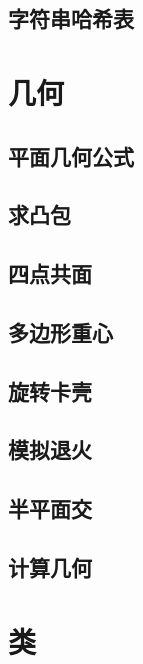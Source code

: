 \section{字符串哈希表}
\raggedbottom
\hrulefill

\chapter{几何}
\section{平面几何公式}
\raggedbottom
\hrulefill
\section{求凸包}
\raggedbottom
\hrulefill
\section{四点共面}
\raggedbottom
\hrulefill
\section{多边形重心}
\raggedbottom
\hrulefill
\section{旋转卡壳}
\raggedbottom
\hrulefill
\section{模拟退火}
\raggedbottom
\hrulefill
\section{半平面交}
\raggedbottom
\hrulefill
\section{计算几何}
\raggedbottom
\hrulefill

\chapter{类}
